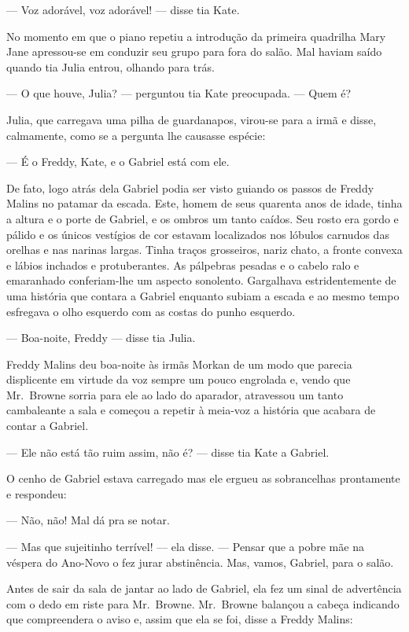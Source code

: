 --- Voz adorável, voz adorável! --- disse tia Kate.

No momento em que o piano repetiu a introdução da primeira quadrilha Mary Jane
apressou-se em conduzir seu grupo para fora do salão.  Mal haviam saído quando
tia Julia entrou, olhando para trás.

--- O que houve, Julia? --- perguntou tia Kate preocupada.  --- Quem é?

Julia, que carregava uma pilha de guardanapos, virou-se para a irmã e disse,
calmamente, como se a pergunta lhe causasse espécie:

--- É o Freddy, Kate, e o Gabriel está com ele.

De fato, logo atrás dela Gabriel podia ser visto guiando os passos de Freddy
Malins no patamar da escada.  Este, homem de seus quarenta anos de idade, tinha
a altura e o porte de Gabriel, e os ombros um tanto caídos.  Seu rosto era
gordo e pálido e os únicos vestígios de cor estavam localizados nos lóbulos
carnudos das orelhas e nas narinas largas.  Tinha traços grosseiros, nariz
chato, a fronte convexa e lábios inchados e protuberantes.  As pálpebras
pesadas e o cabelo ralo e emaranhado conferiam-lhe um aspecto sonolento.
Gargalhava estridentemente de uma história que contara a Gabriel enquanto
subiam a escada e ao mesmo tempo esfregava o olho esquerdo com as costas do
punho esquerdo.

--- Boa-noite, Freddy --- disse tia Julia.

Freddy Malins deu boa-noite às irmãs Morkan de um modo que parecia displicente
em virtude da voz sempre um pouco engrolada e, vendo que Mr.~Browne sorria para
ele ao lado do aparador, atravessou um tanto cambaleante a sala e começou a
repetir à meia-voz a história que acabara de contar a Gabriel.

--- Ele não está tão ruim assim, não é? --- disse tia Kate a Gabriel.

O cenho de Gabriel estava carregado mas ele ergueu as sobrancelhas prontamente
e respondeu:

--- Não, não!  Mal dá pra se notar.

--- Mas que sujeitinho terrível! --- ela disse.  --- Pensar que a pobre mãe na
véspera do Ano-Novo o fez jurar abstinência.  Mas, vamos, Gabriel, para o
salão.

Antes de sair da sala de jantar ao lado de Gabriel, ela fez um sinal de
advertência com o dedo em riste para Mr.~Browne.  Mr.~Browne balançou a cabeça
indicando que compreendera o aviso e, assim que ela se foi, disse a Freddy
Malins:

